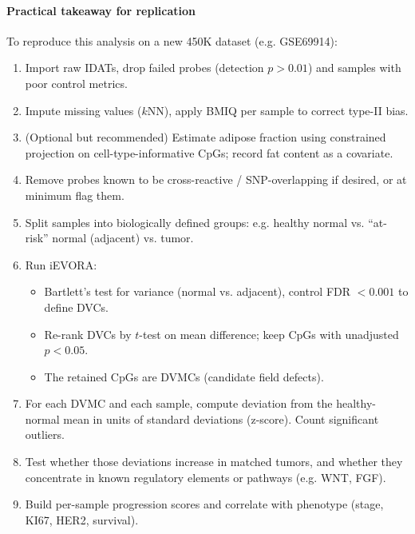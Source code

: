 \documentclass[10pt]{extarticle}
\begin{document}
\paragraph{Practical takeaway for replication}
To reproduce this analysis on a new 450K dataset (e.g. GSE69914): 
\begin{enumerate}
  \item Import raw IDATs, drop failed probes (detection $p>0.01$) and samples with poor control metrics.
  \item Impute missing values ($k$NN), apply BMIQ per sample to correct type-II bias.
  \item (Optional but recommended) Estimate adipose fraction using constrained projection on cell-type-informative CpGs; record fat content as a covariate.
  \item Remove probes known to be cross-reactive / SNP-overlapping if desired, or at minimum flag them.
  \item Split samples into biologically defined groups: e.g. healthy normal vs. “at-risk” normal (adjacent) vs. tumor.
  \item Run iEVORA: 
    \begin{itemize}[label=-]
      \item Bartlett’s test for variance (normal vs. adjacent), control FDR $<0.001$ to define DVCs.
      \item Re-rank DVCs by $t$-test on mean difference; keep CpGs with unadjusted $p<0.05$.
      \item The retained CpGs are DVMCs (candidate field defects).
    \end{itemize}
  \item For each DVMC and each sample, compute deviation from the healthy-normal mean in units of standard deviations (z-score). Count significant outliers.
  \item Test whether those deviations increase in matched tumors, and whether they concentrate in known regulatory elements or pathways (e.g. WNT, FGF).
  \item Build per-sample progression scores and correlate with phenotype (stage, KI67, HER2, survival). 
\end{enumerate}
\end{document}
